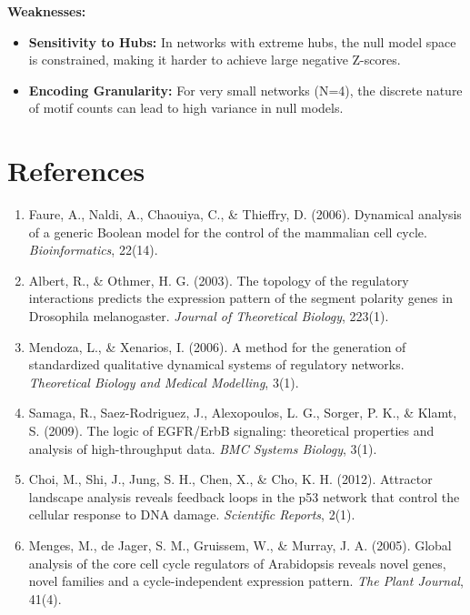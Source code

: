 \documentclass{article}
\begin{document}
\textbf{Weaknesses:}
\begin{itemize}
    \item \textbf{Sensitivity to Hubs:} In networks with extreme hubs, the null model space is constrained, making it harder to achieve large negative Z-scores.
    \item \textbf{Encoding Granularity:} For very small networks (N=4), the discrete nature of motif counts can lead to high variance in null models.
\end{itemize}

\section{References}
\begin{enumerate}
    \item Faure, A., Naldi, A., Chaouiya, C., \& Thieffry, D. (2006). Dynamical analysis of a generic Boolean model for the control of the mammalian cell cycle. \textit{Bioinformatics}, 22(14).
    \item Albert, R., \& Othmer, H. G. (2003). The topology of the regulatory interactions predicts the expression pattern of the segment polarity genes in Drosophila melanogaster. \textit{Journal of Theoretical Biology}, 223(1).
    \item Mendoza, L., \& Xenarios, I. (2006). A method for the generation of standardized qualitative dynamical systems of regulatory networks. \textit{Theoretical Biology and Medical Modelling}, 3(1).
    \item Samaga, R., Saez-Rodriguez, J., Alexopoulos, L. G., Sorger, P. K., \& Klamt, S. (2009). The logic of EGFR/ErbB signaling: theoretical properties and analysis of high-throughput data. \textit{BMC Systems Biology}, 3(1).
    \item Choi, M., Shi, J., Jung, S. H., Chen, X., \& Cho, K. H. (2012). Attractor landscape analysis reveals feedback loops in the p53 network that control the cellular response to DNA damage. \textit{Scientific Reports}, 2(1).
    \item Menges, M., de Jager, S. M., Gruissem, W., \& Murray, J. A. (2005). Global analysis of the core cell cycle regulators of Arabidopsis reveals novel genes, novel families and a cycle-independent expression pattern. \textit{The Plant Journal}, 41(4).
\end{enumerate}
\end{document}
